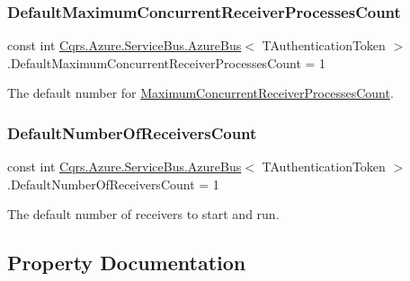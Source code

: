 \subsubsection{\texorpdfstring{Default\+Maximum\+Concurrent\+Receiver\+Processes\+Count}{DefaultMaximumConcurrentReceiverProcessesCount}}
{\footnotesize\ttfamily const int \hyperlink{classCqrs_1_1Azure_1_1ServiceBus_1_1AzureBus}{Cqrs.\+Azure.\+Service\+Bus.\+Azure\+Bus}$<$ T\+Authentication\+Token $>$.Default\+Maximum\+Concurrent\+Receiver\+Processes\+Count = 1\hspace{0.3cm}{\ttfamily [protected]}}



The default number for \hyperlink{classCqrs_1_1Azure_1_1ServiceBus_1_1AzureBus_a6b517888d91c6a5b026cb5857e75a04f_a6b517888d91c6a5b026cb5857e75a04f}{Maximum\+Concurrent\+Receiver\+Processes\+Count}. 

\mbox{\label{classCqrs_1_1Azure_1_1ServiceBus_1_1AzureBus_a19642a14d6cf036cbbdb68b9ba7e635d_a19642a14d6cf036cbbdb68b9ba7e635d}} 
\subsubsection{\texorpdfstring{Default\+Number\+Of\+Receivers\+Count}{DefaultNumberOfReceiversCount}}
{\footnotesize\ttfamily const int \hyperlink{classCqrs_1_1Azure_1_1ServiceBus_1_1AzureBus}{Cqrs.\+Azure.\+Service\+Bus.\+Azure\+Bus}$<$ T\+Authentication\+Token $>$.Default\+Number\+Of\+Receivers\+Count = 1\hspace{0.3cm}{\ttfamily [protected]}}



The default number of receivers to start and run. 



\subsection{Property Documentation}
\mbox{\label{classCqrs_1_1Azure_1_1ServiceBus_1_1AzureBus_a5250b75a5ef26d52a96da74777958519_a5250b75a5ef26d52a96da74777958519}} 
